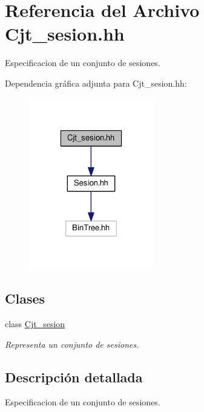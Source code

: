 \hypertarget{_cjt__sesion_8hh}{}\section{Referencia del Archivo Cjt\+\_\+sesion.\+hh}
\label{_cjt__sesion_8hh}


Especificacion de un conjunto de sesiones.  


Dependencia gráfica adjunta para Cjt\+\_\+sesion.\+hh\+:
\nopagebreak
\begin{figure}[H]
\begin{center}
\leavevmode
\includegraphics[width=154pt]{_cjt__sesion_8hh__incl}
\end{center}
\end{figure}
\subsection*{Clases}
\begin{DoxyCompactItemize}
\item 
class \mbox{\hyperlink{class_cjt__sesion}{Cjt\+\_\+sesion}}
\begin{DoxyCompactList}\small\item\em Representa un conjunto de sesiones. \end{DoxyCompactList}\end{DoxyCompactItemize}


\subsection{Descripción detallada}
Especificacion de un conjunto de sesiones. 

